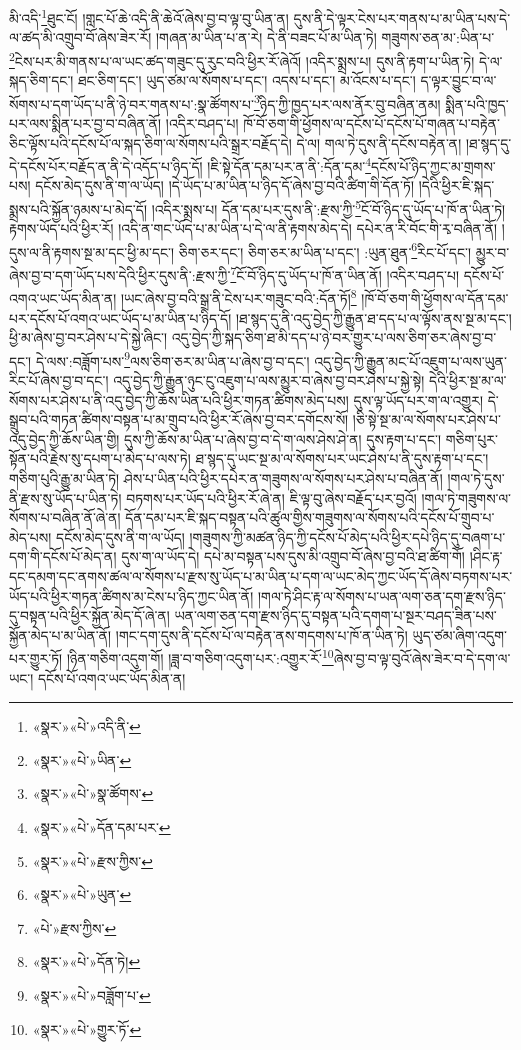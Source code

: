མི་འདི་\footnote{«སྣར་»«པེ་»འདི་ནི་}ཐུང་ངོ། །གླང་པོ་ཆེ་འདི་ནི་ཆེའོ་ཞེས་བྱ་བ་ལྟ་བུ་ཡིན་ན། དུས་ནི་དེ་ལྟར་ངེས་པར་གནས་པ་མ་ཡིན་པས་དེ་ལ་ཚད་མི་འགྲུབ་བོ་ཞེས་ཟེར་རོ། །གཞན་མ་ཡིན་པ་ན་རེ། དེ་ནི་བཟང་པོ་མ་ཡིན་ཏེ། གཟུགས་ཅན་མ་:ཡིན་པ་\footnote{«སྣར་»«པེ་»ཡིན་}ངེས་པར་མི་གནས་པ་ལ་ཡང་ཚད་གཟུང་དུ་རུང་བའི་ཕྱིར་རོ་ཞེའོ། །འདིར་སྨྲས་པ། དུས་ནི་རྟག་པ་ཡིན་ཏེ། དེ་ལ་སྐད་ཅིག་དང་། ཐང་ཅིག་དང་། ཡུད་ཙམ་ལ་སོགས་པ་དང་། འདས་པ་དང་། མ་འོངས་པ་དང་། ད་ལྟར་བྱུང་བ་ལ་སོགས་པ་དག་ཡོད་པ་ནི་ཉེ་བར་གནས་པ་:སྣ་ཚོགས་པ་\footnote{«སྣར་»«པེ་»སྣ་ཚོགས་}ཉིད་ཀྱི་ཁྱད་པར་ལས་ནོར་བུ་བཞིན་ནམ། སྨིན་པའི་ཁྱད་པར་ལས་སྨིན་པར་བྱ་བ་བཞིན་ནོ། །འདིར་བཤད་པ། ཁོ་བོ་ཅག་གི་ཕྱོགས་ལ་དངོས་པོ་དངོས་པོ་གཞན་པ་བརྟེན་ཅིང་ལྟོས་པའི་དངོས་པོ་ལ་སྐད་ཅིག་ལ་སོགས་པའི་སྒྲར་བརྗོད་དེ། དེ་ལ། གལ་ཏེ་དུས་ནི་དངོས་བརྟེན་ན། །ཐ་སྙད་དུ་དེ་དངོས་པོར་བརྗོད་ན་ནི་དེ་འདོད་པ་ཉིད་དོ། །ཇི་སྟེ་དོན་དམ་པར་ན་ནི་:དོན་དམ་\footnote{«སྣར་»«པེ་»དོན་དམ་པར་}དངོས་པོ་ཉིད་ཀྱང་མ་གྲགས་པས། དངོས་མེད་དུས་ནི་ག་ལ་ཡོད། །དེ་ཡོད་པ་མ་ཡིན་པ་ཉིད་དོ་ཞེས་བྱ་བའི་ཚིག་གི་དོན་ཏོ། །དེའི་ཕྱིར་ཇི་སྐད་སྨྲས་པའི་སྐྱོན་ཉམས་པ་མེད་དོ། །འདིར་སྨྲས་པ། དོན་དམ་པར་དུས་ནི་:རྫས་ཀྱི་\footnote{«སྣར་»«པེ་»རྫས་ཀྱིས་}ངོ་བོ་ཉིད་དུ་ཡོད་པ་ཁོ་ན་ཡིན་ཏེ། རྟགས་ཡོད་པའི་ཕྱིར་རོ། །འདི་ན་གང་ཡོད་པ་མ་ཡིན་པ་དེ་ལ་ནི་རྟགས་མེད་དེ། དཔེར་ན་རི་བོང་གི་རྭ་བཞིན་ནོ། །དུས་ལ་ནི་རྟགས་སྔ་མ་དང་ཕྱི་མ་དང་། ཅིག་ཅར་དང་། ཅིག་ཅར་མ་ཡིན་པ་དང་། :ཡུན་ཐུན་\footnote{«སྣར་»«པེ་»ཡུན་}རིང་པོ་དང་། མྱུར་བ་ཞེས་བྱ་བ་དག་ཡོད་པས་དེའི་ཕྱིར་དུས་ནི་:རྫས་ཀྱི་\footnote{«པེ་»རྫས་ཀྱིས་}ངོ་བོ་ཉིད་དུ་ཡོད་པ་ཁོ་ན་ཡིན་ནོ། །འདིར་བཤད་པ། དངོས་པོ་འགའ་ཡང་ཡོད་མིན་ན། །ཡང་ཞེས་བྱ་བའི་སྒྲ་ནི་ངེས་པར་གཟུང་བའི་:དོན་ཏོ།\footnote{«སྣར་»«པེ་»དོན་ཏེ།} །ཁོ་བོ་ཅག་གི་ཕྱོགས་ལ་དོན་དམ་པར་དངོས་པོ་འགའ་ཡང་ཡོད་པ་མ་ཡིན་པ་ཉིད་དོ། །ཐ་སྙད་དུ་ནི་འདུ་བྱེད་ཀྱི་རྒྱུན་ཐ་དད་པ་ལ་ལྟོས་ནས་སྔ་མ་དང་། ཕྱི་མ་ཞེས་བྱ་བར་ཤེས་པ་དེ་སྐྱེ་ཞིང་། འདུ་བྱེད་ཀྱི་སྐད་ཅིག་ཐ་མི་དད་པ་ཉེ་བར་གྱུར་པ་ལས་ཅིག་ཅར་ཞེས་བྱ་བ་དང་། དེ་ལས་:བཟློག་པས་\footnote{«སྣར་»«པེ་»བཟློག་པ་}ལས་ཅིག་ཅར་མ་ཡིན་པ་ཞེས་བྱ་བ་དང་། འདུ་བྱེད་ཀྱི་རྒྱུན་མང་པོ་འཇུག་པ་ལས་ཡུན་རིང་པོ་ཞེས་བྱ་བ་དང་། འདུ་བྱེད་ཀྱི་རྒྱུན་ཉུང་ངུ་འཇུག་པ་ལས་མྱུར་བ་ཞེས་བྱ་བར་ཤེས་པ་སྐྱེ་སྟེ། དེའི་ཕྱིར་སྔ་མ་ལ་སོགས་པར་ཤེས་པ་ནི་འདུ་བྱེད་ཀྱི་ཆོས་ཡིན་པའི་ཕྱིར་གཏན་ཚིགས་མེད་པས། དུས་ལྟ་ཡོད་པར་ག་ལ་འགྱུར། དེ་སྒྲུབ་པའི་གཏན་ཚིགས་བསྟན་པ་མ་གྲུབ་པའི་ཕྱིར་རོ་ཞེས་བྱ་བར་དགོངས་སོ། །ཅི་སྟེ་སྔ་མ་ལ་སོགས་པར་ཤེས་པ་འདུ་བྱེད་ཀྱི་ཆོས་ཡིན་གྱི། དུས་ཀྱི་ཆོས་མ་ཡིན་པ་ཞེས་བྱ་བ་དེ་ག་ལས་ཤེས་ཤེ་ན། དུས་རྟག་པ་དང་། གཅིག་པུར་སྟོན་པའི་རྗེས་སུ་དཔག་པ་མེད་པ་ལས་ཏེ། ཐ་སྙད་དུ་ཡང་སྔ་མ་ལ་སོགས་པར་ཡང་ཤེས་པ་ནི་དུས་རྟག་པ་དང་། གཅིག་པུའི་རྒྱུ་མ་ཡིན་ཏེ། ཤེས་པ་ཡིན་པའི་ཕྱིར་དཔེར་ན་གཟུགས་ལ་སོགས་པར་ཤེས་པ་བཞིན་ནོ། །གལ་ཏེ་དུས་ནི་རྫས་སུ་ཡོད་པ་ཡིན་ཏེ། བཏགས་པར་ཡོད་པའི་ཕྱིར་རོ་ཞེ་ན། ཇི་ལྟ་བུ་ཞེས་བརྗོད་པར་བྱའོ། །གལ་ཏེ་གཟུགས་ལ་སོགས་པ་བཞིན་ནོ་ཞེ་ན། དོན་དམ་པར་ཇི་སྐད་བསྟན་པའི་ཚུལ་གྱིས་གཟུགས་ལ་སོགས་པའི་དངོས་པོ་གྲུབ་པ་མེད་པས། དངོས་མེད་དུས་ནི་ག་ལ་ཡོད། །གཟུགས་ཀྱི་མཚན་ཉིད་ཀྱི་དངོས་པོ་མེད་པའི་ཕྱིར་དཔེ་ཉིད་དུ་བཞག་པ་དག་གི་དངོས་པོ་མེད་ན། དུས་ག་ལ་ཡོད་དེ། དཔེ་མ་བསྟན་པས་དུས་མི་འགྲུབ་བོ་ཞེས་བྱ་བའི་ཐ་ཚིག་གོ། །ཤིང་རྟ་དང་དམག་དང་ནགས་ཚལ་ལ་སོགས་པ་རྫས་སུ་ཡོད་པ་མ་ཡིན་པ་དག་ལ་ཡང་མེད་ཀྱང་ཡོད་དོ་ཞེས་བཏགས་པར་ཡོད་པའི་ཕྱིར་གཏན་ཚིགས་མ་ངེས་པ་ཉིད་ཀྱང་ཡིན་ནོ། །གལ་ཏེ་ཤིང་རྟ་ལ་སོགས་པ་ཡན་ལག་ཅན་དག་རྫས་ཉིད་དུ་བསྟན་པའི་ཕྱིར་སྐྱོན་མེད་དོ་ཞེ་ན། ཡན་ལག་ཅན་དག་རྫས་ཉིད་དུ་བསྟན་པའི་དགག་པ་སྔར་བཤད་ཟིན་པས་སྐྱོན་མེད་པ་མ་ཡིན་ནོ། །གང་དག་དུས་ནི་དངོས་པོ་ལ་བརྟེན་ནས་གདགས་པ་ཁོ་ན་ཡིན་ཏེ། ཡུད་ཙམ་ཞིག་འདུག་པར་གྱུར་ཏོ། །ཉིན་གཅིག་འདུག་གོ། །ཟླ་བ་གཅིག་འདུག་པར་:འགྱུར་རོ་\footnote{«སྣར་»«པེ་»གྱུར་ཏོ་}ཞེས་བྱ་བ་ལྟ་བུའོ་ཞེས་ཟེར་བ་དེ་དག་ལ་ཡང་། དངོས་པོ་འགའ་ཡང་ཡོད་མིན་ན། 